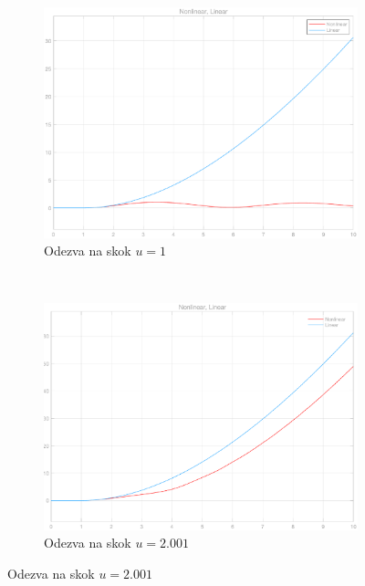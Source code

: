 \documentclass{article}
\begin{document}
\begin{enumerate}
    \begin{figure}[H]
        \centering
        \begin{subfigure}[b]{0.45\textwidth}
            \includegraphics[width=\textwidth]{ARI_HW_0_3_linear.eps}
            \caption{Odezva na skok $u=1$}
        \end{subfigure}
        ~
        \begin{subfigure}[b]{0.45\textwidth}
            \includegraphics[width=\textwidth]{ARI_HW_0_3_NonLinear.eps}
            \caption{Odezva na skok $u=2.001$}
        \end{subfigure}
    \end{figure}
    
\end{enumerate}
\end{document}
